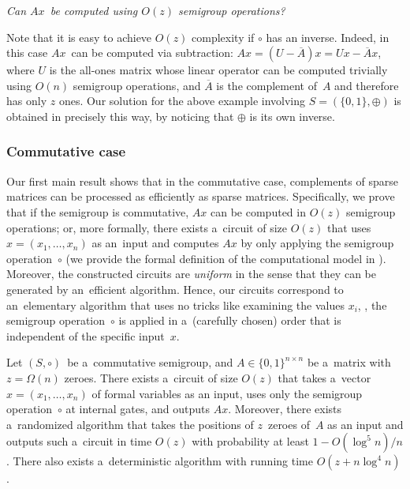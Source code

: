 \documentclass{toc}
\begin{document}
\vspace{2mm}
\emph{Can $Ax$~be computed using $O(z)$ semigroup operations?}
\vspace{2mm}

\noindent
Note that it is easy to achieve $O(z)$ complexity if $\circ$ has an inverse.
Indeed, in this case $Ax$~can be computed via subtraction:
$Ax = (U-\overline{A})x = Ux - \overline{A}x$, where $U$ is the all-ones matrix
whose linear operator can be computed trivially using $O(n)$ semigroup
operations, and $\overline{A}$ is the complement of~$A$ and therefore has only
$z$ ones. Our solution for the above example involving $S=(\{0,1\}, \oplus)$
is obtained in precisely this way, by noticing that $\oplus$ is its own inverse.

\subsubsection{Commutative case}
Our first main result shows that in the commutative case, complements
of sparse matrices can be processed as
efficiently as sparse matrices. Specifically, we prove
that if the semigroup is commutative, $Ax$ can be computed in $O(z)$ semigroup
operations; or, more formally, there exists
a~circuit of size $O(z)$ that uses $x=(x_1, \dotsc, x_n)$ as
an~input and computes $Ax$ by only applying the semigroup
operation~$\circ$ (we provide the formal definition of the
computational model in ). Moreover,
the constructed circuits are \emph{uniform} in the sense that they
can be generated by an~efficient algorithm. Hence, our circuits
correspond to an~elementary algorithm that uses no tricks like examining the
values $x_i$, \ie, the semigroup operation~$\circ$ is applied in a~(carefully
chosen) order that is independent of the specific input~$x$.

\begin{theorem}
\label{thm:upperboundold}
Let $(S, \circ)$~be a~commutative semigroup,
and $A \in \{0,1\}^{n \times n}$ be a~matrix
with~$z=\Omega(n)$ zeroes.
There exists a~circuit of size $O(z)$ that takes
a~vector $x = (x_1,\ldots, x_n)$ of formal variables as an input,
uses only the semigroup operation~$\circ$ at internal gates,
and outputs $Ax$. Moreover, there exists a~randomized
algorithm that takes the positions of $z$~zeroes of~$A$
as an input and outputs such a~circuit in time $O(z)$
with probability at least $1-O(\log^5n)/n$. There also
exists a~deterministic algorithm with running time $O(z+n\log^4n)$.
\end{theorem}
\end{document}
